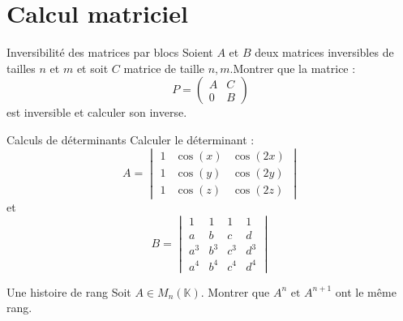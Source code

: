 \documentclass[french, a4paper, 11pt]{article}
\begin{document}
\section*{Calcul matriciel}

\begin{cadre}{Inversibilité des matrices par blocs}
  Soient $A$ et $B$ deux matrices inversibles de tailles $n$ et $m$ et soit $C$ matrice de taille $n,m$.Montrer que la matrice :
    \[P=\begin{pmatrix}
      A & C \\
      0 & B
    \end{pmatrix}\]
  est inversible et calculer son inverse.
\end{cadre}

\begin{cadre}{Calculs de déterminants}
  Calculer le déterminant :
  \[A=\begin{vmatrix}
    1 & \cos(x) & \cos(2x) \\
    1 & \cos(y) & \cos(2y) \\
    1 & \cos(z) & \cos(2z)
  \end{vmatrix}\] et 
  \[B=\begin{vmatrix}
    1 & 1 & 1 & 1 \\
    a & b & c & d \\
    a^3 & b^3 & c^3 & d^3 \\
    a^4 & b^4 & c^4 & d^4
  \end{vmatrix}\]
\end{cadre}

\begin{cadre}{Une histoire de rang}
  Soit \(A \in M_n(\mathbb{K})\). Montrer que \(A^n \text{ et } A^{n+1}\) ont le même rang.
\end{cadre}
\end{document}

